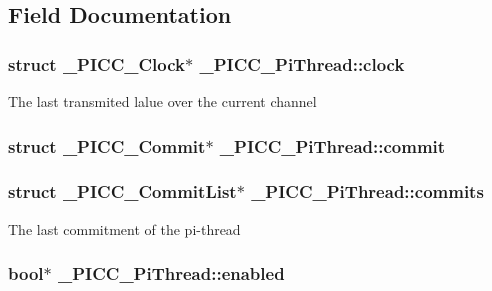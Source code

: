 \subsection{Field Documentation}
\hypertarget{struct__PICC__PiThread_a82e0d888275cbcc0e0995456f0b49e4e}{
\subsubsection[{clock}]{\setlength{\rightskip}{0pt plus 5cm}struct {\bf \-\_\-\-P\-I\-C\-C\-\_\-\-Clock}$\ast$ \-\_\-\-P\-I\-C\-C\-\_\-\-Pi\-Thread\-::clock}}\label{struct__PICC__PiThread_a82e0d888275cbcc0e0995456f0b49e4e}
The last transmited lalue over the current channel \hypertarget{struct__PICC__PiThread_a7fabb4c7acd615b20bdccd6ed32ff4f8}{
\subsubsection[{commit}]{\setlength{\rightskip}{0pt plus 5cm}struct {\bf \-\_\-\-P\-I\-C\-C\-\_\-\-Commit}$\ast$ \-\_\-\-P\-I\-C\-C\-\_\-\-Pi\-Thread\-::commit}}\label{struct__PICC__PiThread_a7fabb4c7acd615b20bdccd6ed32ff4f8}
\hypertarget{struct__PICC__PiThread_af9256cdd22994cccbe76e7ef530430f8}{
\subsubsection[{commits}]{\setlength{\rightskip}{0pt plus 5cm}struct {\bf \-\_\-\-P\-I\-C\-C\-\_\-\-Commit\-List}$\ast$ \-\_\-\-P\-I\-C\-C\-\_\-\-Pi\-Thread\-::commits}}\label{struct__PICC__PiThread_af9256cdd22994cccbe76e7ef530430f8}
The last commitment of the pi-\/thread \hypertarget{struct__PICC__PiThread_a1f2c99b2169bd58582a8b4320c2106a0}{
\subsubsection[{enabled}]{\setlength{\rightskip}{0pt plus 5cm}bool$\ast$ \-\_\-\-P\-I\-C\-C\-\_\-\-Pi\-Thread\-::enabled}}\label{struct__PICC__PiThread_a1f2c99b2169bd58582a8b4320c2106a0}
